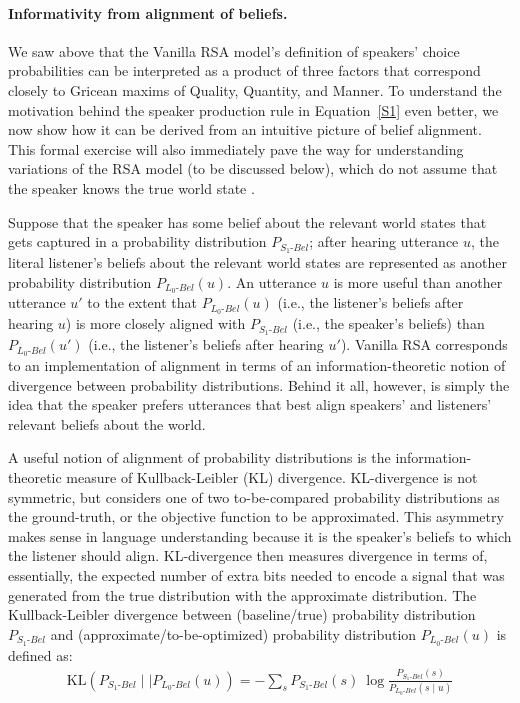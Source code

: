 \documentclass{sp}
\begin{document}
\paragraph{Informativity from alignment of beliefs.} We saw above that the Vanilla RSA
model's definition of speakers' choice probabilities can be interpreted as a product of three
factors that correspond closely to Gricean maxims of Quality, Quantity, and Manner.
To understand the motivation behind the speaker production rule in Equation~\eqref{S1} even better, we now show how it can be derived from an intuitive picture of belief alignment.
This formal exercise will also immediately pave the way for understanding variations of the RSA model (to be discussed below), which do not assume that the speaker knows the true world state \citep{goodmanstuhlmuller2013,HerbstrittFranke2019:Complex-probabi}.

Suppose that the speaker has some belief about the relevant world states that gets captured in a probability distribution $P_{S_{1}\text{-}Bel}$;
after hearing utterance $u$, the literal listener's beliefs about the relevant world states are represented as another probability distribution $P_{L_{0}\text{-}Bel}(u)$.
An utterance $u$ is more useful than another utterance $u'$ to the extent that $P_{L_{0}\text{-}Bel}(u)$  (i.e., the listener's beliefs after hearing $u$) is more closely aligned with $P_{S_{1}\text{-}Bel}$ (i.e., the speaker's beliefs) than $P_{L_{0}\text{-}Bel}(u')$  (i.e., the listener's beliefs after hearing $u'$).
Vanilla RSA corresponds to an implementation of alignment in terms of an information-theoretic notion of divergence between probability distributions.
Behind it all, however, is simply the idea that the speaker prefers utterances that best align speakers' and listeners' relevant beliefs about the world.

A useful notion of alignment of probability distributions is the information-theoretic
measure of Kullback-Leibler (KL) divergence. KL-divergence is not symmetric, but considers one of
two to-be-compared probability distributions as the ground-truth, or the objective function
to be approximated.
This asymmetry makes sense in language understanding because it is the speaker's
beliefs to which the listener should align. KL-divergence then measures divergence in terms of,
essentially, the expected number of extra bits needed to encode a signal that was generated
from the true distribution with the approximate distribution.
The Kullback-Leibler divergence between (baseline/true) probability distribution
$P_{S_{1}\text{-}Bel}$ and (approximate/to-be-optimized) probability distribution
$P_{L_{0}\text{-}Bel}(u)$ is defined as:
\begin{align}
  \label{eq:KL-divergence}
  \text{KL}(P_{S_{1}\text{-}Bel} \mid \mid P_{L_{0}\text{-}Bel}(u)) = - \sum_{s} P_{S_{1}\text{-}Bel}(s) \ \log \frac{P_{S_{1}\text{-}Bel}(s)}{P_{L_{0}\text{-}Bel}(s \mid u)}
\end{align}
\end{document}
